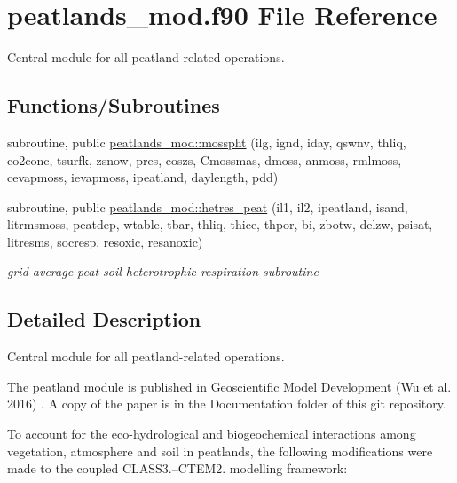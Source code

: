 \hypertarget{peatlands__mod_8f90}{}\section{peatlands\+\_\+mod.\+f90 File Reference}
\label{peatlands__mod_8f90}


Central module for all peatland-\/related operations.  


\subsection*{Functions/\+Subroutines}
{\bf }\par
\begin{DoxyCompactItemize}
\item 
subroutine, public \hyperlink{group__moss__photosynthesis_ga84f8b27aaf29d0ca4b5c06e3972951a5}{peatlands\+\_\+mod\+::mosspht} (ilg, ignd, iday, qswnv, thliq, co2conc, tsurfk, zsnow, pres, coszs, Cmossmas, dmoss, anmoss, rmlmoss, cevapmoss, ievapmoss, ipeatland, daylength, pdd)
\end{DoxyCompactItemize}

{\bf }\par
\begin{DoxyCompactItemize}
\item 
subroutine, public \hyperlink{group__peat__soil__het__resp_gaed12b76ec8925a4bc3105f8ae7a36888}{peatlands\+\_\+mod\+::hetres\+\_\+peat} (il1, il2, ipeatland, isand, litrmsmoss, peatdep, wtable, tbar, thliq, thice, thpor, bi, zbotw, delzw, psisat, litresms, socresp, resoxic, resanoxic)
\begin{DoxyCompactList}\small\item\em grid average peat soil heterotrophic respiration subroutine \end{DoxyCompactList}\end{DoxyCompactItemize}



\subsection{Detailed Description}
Central module for all peatland-\/related operations. 

The peatland module is published in Geoscientific Model Development (Wu et al. 2016) \cite{Wu2016-zt}. A copy of the paper is in the Documentation folder of this git repository. 

 To account for the eco-\/hydrological and biogeochemical interactions among vegetation, atmosphere and soil in peatlands, the following modifications were made to the coupled C\+L\+A\+S\+S3.--C\+T\+E\+M2. modelling framework\+:


